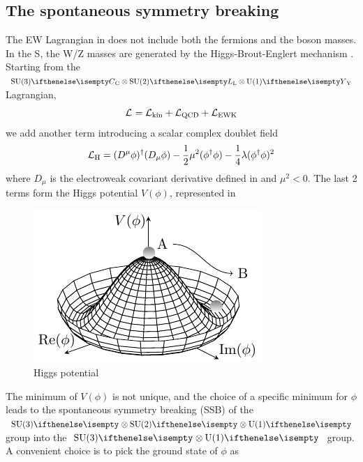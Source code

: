 \subsection{The spontaneous symmetry breaking}\label{sub:SM}
The EW Lagrangian in  does not include both the fermions and the boson masses.
In the S, the W/Z masses are generated by the Higgs-Brout-Englert mechanism \ADDREF.
Starting from the  $\SU[C]{3} \otimes \SU[L]{2} \otimes \U[Y]{1}$ Lagrangian,
\begin{equation}
    \mathcal{L}_\text{}=\mathcal{L}_\text{kin}+\mathcal{L}_\text{QCD}+\mathcal{L}_\text{EWK}
\end{equation}
we add another term introducing a scalar complex doublet field
\begin{equation}\label{eq:Higgs_preSSB}
    \mathcal{L}_\text{H}=(D^{\mu}\phi)^{\dagger}(D_{\mu}\phi)-\frac{1}{2}\mu^{2}(\phi^{\dagger}\phi)-\frac{1}{4}\lambda(\phi^{\dagger}\phi)^{2}
\end{equation}
where $D_\mu$ is the electroweak covariant derivative defined in  and $\mu^2<0$.
The last 2 terms form the Higgs potential $V(\phi)$, represented in 
\begin{figure}[h!]
    \centering
    \includegraphics[width=1\linewidth]{fig/chap02-theory/higgs.pdf}
    \caption{Higgs potential \cite{HiggsTikZ.net}}
    \label{fig:HiggsPotential}
\end{figure}
The minimum of $V(\phi)$ is not unique, and the choice of a specific minimum for $\phi$ leads to the spontaneous symmetry breaking (SSB) of the $\SU{3} \otimes \SU{2} \otimes \U{1}$ group into the $\SU{3} \otimes \U{1}$ group.\\
A convenient choice is to pick the ground state of $\phi$ as
